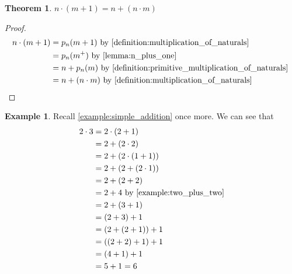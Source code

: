 \documentclass{article}
\theoremstyle{definition}
\theoremstyle{definition}
\newtheorem{example}{Example}[section]
\theoremstyle{plain}
\theoremstyle{remark}
\theoremstyle{plain}
\newtheorem{theorem}{Theorem}[section]
\theoremstyle{remark}
\theoremstyle{plain}
\theoremstyle{plain}
\theoremstyle{plain}
\theoremstyle{plain}
\begin{document}
\begin{theorem}
  \( n \cdot (m + 1) = n + (n \cdot m) \)
\end{theorem}

\begin{proof}
  \begin{align*}
    n \cdot (m+1) &= p_n(m+1)  
                     \text{
                       by \autoref{definition:multiplication_of_naturals}
                     } \\
                  &= p_n(m^{+})
                     \text{
                       by \autoref{lemma:n_plus_one}
                     } \\
                  &= n + p_n(m)
                     \text{
                       by \autoref{%
                            definition:primitive_multiplication_of_naturals%
                          }
                     } \\
                  &= n + (n \cdot m)
                     \text{
                       by \autoref{%
                            definition:multiplication_of_naturals%
                          }
                     } \\
  \end{align*}
\end{proof}

\begin{example}
  Recall \autoref{example:simple_addition} once more. We can see that 
  \begin{align*}
    2 \cdot 3 &= 2 \cdot (2 + 1) \\
              &= 2 + (2 \cdot 2) \\
              &= 2 + (2 \cdot (1 + 1)) \\
              &= 2 + (2 + (2 \cdot 1 )) \\
              &= 2 + (2 + 2) \\
              &= 2 + 4 \text{ by \autoref{example:two_plus_two}} \\
              &= 2 + (3 + 1) \\
              &= (2 + 3) + 1 \\
              &= (2 + (2 + 1)) + 1 \\
              &= ((2 + 2) + 1) + 1 \\
              &= (4 + 1) + 1 \\
              &= 5 + 1 = 6 
  \end{align*}
\end{example}



\end{document}
